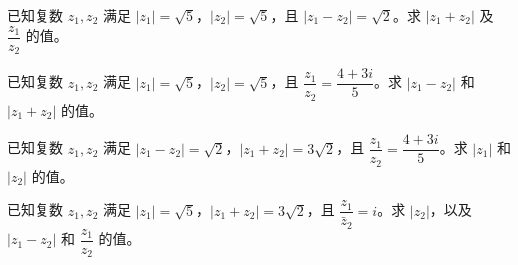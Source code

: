 \documentclass{exam-zh}
\begin{document}

\begin{problem}[points=15]
  已知复数 $z_1, z_2$ 满足 $|z_1| = \sqrt{5}$，$|z_2| = \sqrt{5}$，且 $|z_1 - z_2| = \sqrt{2}$。求 $|z_1 + z_2|$ 及 $\dfrac{z_1}{z_2}$ 的值。
\end{problem}



\begin{problem}[points=15]
  已知复数 $z_1, z_2$ 满足 $|z_1| = \sqrt{5}$，$|z_2| = \sqrt{5}$，且 $\dfrac{z_1}{z_2} = \dfrac{4+3i}{5}$。求 $|z_1 - z_2|$ 和 $|z_1 + z_2|$ 的值。
\end{problem}



\begin{problem}[points=15]
  已知复数 $z_1, z_2$ 满足 $|z_1 - z_2| = \sqrt{2}$，$|z_1 + z_2| = 3\sqrt{2}$，且 $\dfrac{z_1}{z_2} = \dfrac{4+3i}{5}$。求 $|z_1|$ 和 $|z_2|$ 的值。
\end{problem}



\begin{problem}[points=15]
  已知复数 $z_1, z_2$ 满足 $|z_1| = \sqrt{5}$，$|z_1 + z_2| = 3\sqrt{2}$，且 $\dfrac{z_1}{\bar{z}_2} = i$。求 $|z_2|$，以及 $|z_1 - z_2|$ 和 $\dfrac{z_1}{z_2}$ 的值。
\end{problem}
\end{document}
